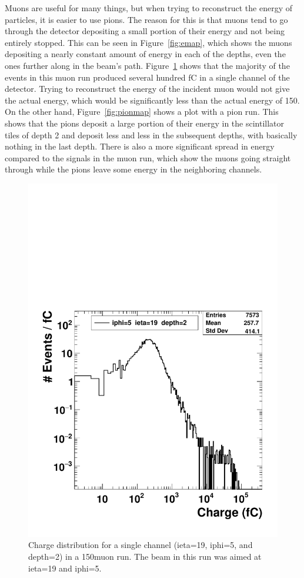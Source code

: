 Muons are useful for many things, but when trying to reconstruct the energy of particles, it is easier to use pions. The reason for this is that muons tend to go through the detector depositing a small portion of their energy and not being entirely stopped. This can be seen in Figure~\ref{fig:emap}, which shows the muons depositing a nearly constant amount of energy in each of the depths, even the ones further along in the beam's path. Figure~\ref{fig:Muon} shows that the majority of the events in this muon run produced several hundred fC in a single channel of the detector. Trying to reconstruct the energy of the incident muon would not give the actual energy, which would be significantly less than the actual energy of 150\GeV. On the other hand, Figure~\ref{fig:pionmap} shows a plot with a pion run. This shows that the pions deposit a large portion of their energy in the scintillator tiles of depth 2 and deposit less and less in the subsequent depths, with basically nothing in the last depth. There is also a more significant spread in energy compared to the signals in the muon run, which show the muons going straight through while the pions leave some energy in the neighboring channels.

\begin{figure}
\centering
\includegraphics[width=0.7\linewidth]{Figures/MuonCharge.pdf}
\caption{Charge distribution for a single channel (ieta=19, iphi=5, and depth=2) in a 150\GeV\space muon run. The beam in this run was aimed at ieta=19 and iphi=5.}
\label{fig:Muon}
\end{figure}


